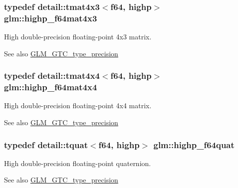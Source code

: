 \subsubsection[{\texorpdfstring{highp\+\_\+f64mat4x3}{highp_f64mat4x3}}]{\setlength{\rightskip}{0pt plus 5cm}typedef detail\+::tmat4x3$<$f64, highp$>$ {\bf glm\+::highp\+\_\+f64mat4x3}}\hypertarget{group__gtc__type__precision_ga0264562b4667b8073b7708efc2280691}{}\label{group__gtc__type__precision_ga0264562b4667b8073b7708efc2280691}
High double-\/precision floating-\/point 4x3 matrix. \begin{DoxySeeAlso}{See also}
\hyperlink{group__gtc__type__precision}{G\+L\+M\+\_\+\+G\+T\+C\+\_\+type\+\_\+precision} 
\end{DoxySeeAlso}
\subsubsection[{\texorpdfstring{highp\+\_\+f64mat4x4}{highp_f64mat4x4}}]{\setlength{\rightskip}{0pt plus 5cm}typedef detail\+::tmat4x4$<$f64, highp$>$ {\bf glm\+::highp\+\_\+f64mat4x4}}\hypertarget{group__gtc__type__precision_gaa95b52552df369b75d09155ebb29b1bd}{}\label{group__gtc__type__precision_gaa95b52552df369b75d09155ebb29b1bd}
High double-\/precision floating-\/point 4x4 matrix. \begin{DoxySeeAlso}{See also}
\hyperlink{group__gtc__type__precision}{G\+L\+M\+\_\+\+G\+T\+C\+\_\+type\+\_\+precision} 
\end{DoxySeeAlso}
\subsubsection[{\texorpdfstring{highp\+\_\+f64quat}{highp_f64quat}}]{\setlength{\rightskip}{0pt plus 5cm}typedef detail\+::tquat$<$f64, highp$>$ {\bf glm\+::highp\+\_\+f64quat}}\hypertarget{group__gtc__type__precision_ga9372e8b60f401fd94aba637b3ed17cfc}{}\label{group__gtc__type__precision_ga9372e8b60f401fd94aba637b3ed17cfc}
High double-\/precision floating-\/point quaternion. \begin{DoxySeeAlso}{See also}
\hyperlink{group__gtc__type__precision}{G\+L\+M\+\_\+\+G\+T\+C\+\_\+type\+\_\+precision} 
\end{DoxySeeAlso}

